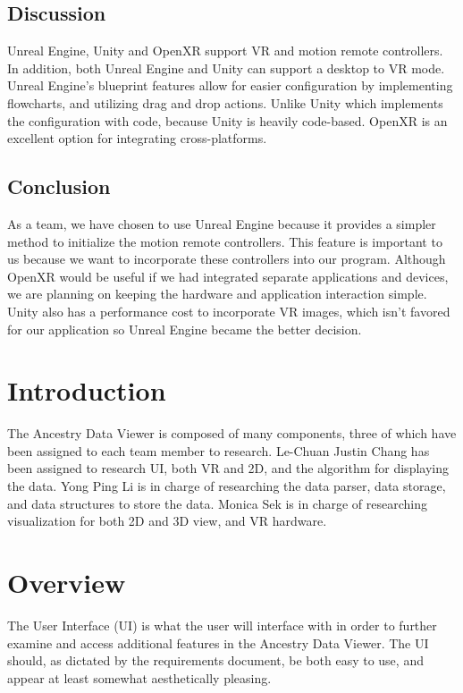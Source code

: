 \documentclass[onecolumn, draftclsnofoot,10pt, compsoc]{IEEEtran}
\begin{document}
\subsection{Discussion}
\begin{singlespace}
Unreal Engine, Unity and OpenXR support VR and motion remote controllers. In addition, both Unreal Engine and Unity can support a desktop to VR mode. Unreal Engine’s blueprint features allow for easier configuration by implementing flowcharts, and utilizing drag and drop actions. Unlike Unity which implements the configuration with code, because Unity is heavily code-based. OpenXR is an excellent option for integrating cross-platforms. 
\end{singlespace}

\subsection{Conclusion}
\begin{singlespace}
As a team, we have chosen to use Unreal Engine because it provides a simpler method to initialize the motion remote controllers. This feature is important to us because we want to incorporate these controllers into our program. Although OpenXR would be useful if we had integrated separate applications and devices, we are planning on keeping the hardware and application interaction simple. Unity also has a performance cost to incorporate VR images, which isn’t favored for our application so Unreal Engine became the better decision.   
\end{singlespace}

\newpage

\section{Introduction}
The Ancestry Data Viewer is composed of many components, three of which have been assigned to each team member to research. Le-Chuan Justin Chang has been assigned to research UI, both VR and 2D, and the algorithm for displaying the data. Yong Ping Li is in charge of researching the data parser, data storage, and data structures to store the data. Monica Sek is in charge of researching visualization for both 2D and 3D view, and VR hardware.

\section{Overview}
The User Interface (UI) is what the user will interface with in order to further examine and access additional features in the Ancestry Data Viewer. The UI should, as dictated by the requirements document, be both easy to use, and appear at least somewhat aesthetically pleasing.
\end{document}
